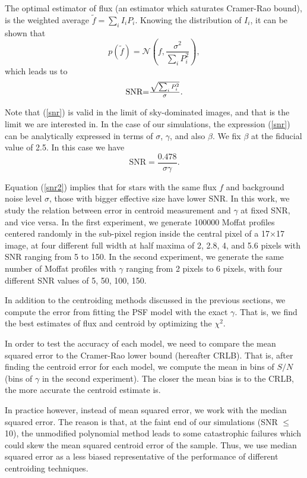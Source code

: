 \documentclass[12pt, preprint]{aastex}
\newcommand{\beq}{\begin{equation}}
\newcommand{\eeq}{\end{equation}}
\begin{document}
The optimal estimator of flux (an estimator which saturates Cramer-Rao bound), is the weighted average $\tilde{f}=\sum_{i}I_{i}P_{i}$. Knowing the distribution of $I_{i}$, it can be shown that 
\beq
p(\tilde{f}) = \mathcal{N}(f , \frac{\sigma^{2}}{\sum_{i}P_{i}^{2}}),
\eeq  
which leads us to
\beq
\begin{array}{l}
\text{SNR} $=$ \frac{\sqrt{\sum_{i} P_{i}^{2}}}{\sigma}.
\end{array}
\label{snr}
\eeq

Note that (\ref{snr}) is valid in the limit of sky-dominated images, and that is the limit we are interested in. In the case of our simulations, the expression (\ref{snr}) can be analytically expressed in terms of $\sigma$, $\gamma$, and also $\beta$. We fix $\beta$ at the fiducial value of 2.5. In this case we have
\beq
\text{SNR} = \frac{0.478}{\sigma \gamma}.
\label{snr2}
\eeq

Equation (\ref{snr2}) implies that for stars with the same flux $f$ and background noise level $\sigma$, those with bigger effective size have lower SNR.
In this work, we study the relation between error in centroid measurement and $\gamma$ at fixed SNR, and vice versa. In the first experiment, we generate 100000 Moffat profiles centered randomly in the sub-pixel region inside the central pixel of a 17$\times$17 image, at four different full width at half maxima of 2, 2.8, 4, and 5.6 pixels with SNR ranging from 5 to 150. In the second experiment, we generate the same number of Moffat profiles with $\gamma$ ranging from 2 pixels to 6 pixels, with four different SNR values of 5, 50, 100, 150.

In addition to the centroiding methods discussed in the previous sections, we compute the error from fitting the PSF model with the exact $\gamma$. That is, we find the best estimates of flux and centroid by optimizing the $\chi^{2}$. 

In order to test the accuracy of each model, we need to compare the mean squared error to the Cramer-Rao lower bound (hereafter CRLB). That is, after finding the centroid error for each model, we compute the mean in bins of $S/N$ (bins of $\gamma$ in the second experiment). The closer the mean bias is to the CRLB, the more accurate the centroid estimate is.

In practice however, instead of mean squared error, we work with the median squared error. The reason is that, at the faint end of our simulations (SNR $\leq$ 10), the unmodified polynomial method leads to some catastrophic failures which could skew the mean squared centroid error of the sample. Thus, we use median squared error as a less biased representative of the performance of different centroiding techniques. 
 
\end{document}
